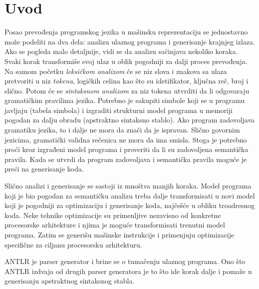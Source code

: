 \chapter{Uvod}
\label{ch:uvod}

Posao prevođenja programskog jezika u mašinsku reprezentaciju se jednostavno može podeliti na dva dela: analizu ulaznog programa i generisanje krajnjeg izlaza. 
Ako se pogleda malo detaljnije, vidi se da analizu sačinjava nekoliko koraka.
Svaki korak transformiše svoj ulaz u oblik pogodniji za dalji proces prevođenja.
Na samom početku \emph{leksičkom analizom} će se niz slova i znakova sa ulaza pretvoriti u niz \emph{tokena}, logičkih celina kao što su idetifikator, ključna reč, broj i slično.
Potom će se \emph{sintaksnom analizom} za niz tokena utvrditi da li odgovaraju gramatičkim pravilima jezika. 
Potrebno je sakupiti simbole koji se u programu javljaju (tabela simbola) i izgraditi strukturni model programa u memoriji pogodan za dalju obradu (apstraktno sintaksno stablo).
Ako program zadovoljava gramatiku jezika, to i dalje ne mora da znači da je ispravan.
Slično govornim jezicima, gramatički validna rečenica ne mora da ima smisla.
Stoga je potrebno proći kroz izgrađeni model programa i proveriti da li su zadovoljena semantička pravila. 
Kada se utvrdi da program zadovoljava i semantička pravila moguće je preći na generisanje koda.

Slično analizi i generisanje se sastoji iz mnoštva manjih koraka.
Model programa koji je bio pogodan za semantičku analizu treba dalje transformisati u novi model koji je pogodniji za optimizaciju i generisanje koda, najčešće u obliku troadresnog koda.
Neke tehnike optimizacije su primenljive nezavisno od konkretne procesorske arhitekture i njima je moguće transformisati trenutni model programa.
Zatim se generišu mašinske instrukcije i primenjuju optimizacije specifične za ciljanu procesorsku arhitekturu.

ANTLR je parser generator i brine se o tumačenju ulaznog programa.
Ono što ANTLR izdvaja od drugih parser generatora je to što ide korak dalje i pomaže u generisanju apstraktnog sintaksnog stabla.

